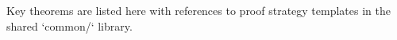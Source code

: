 Key theorems are listed here with references to proof strategy templates in the shared `common/` library.
